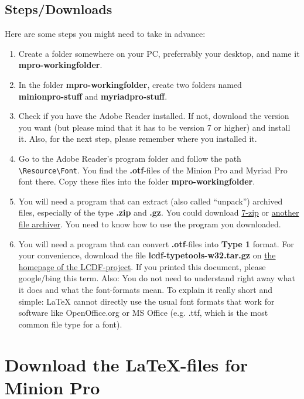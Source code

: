 \subsection{Steps/Downloads}

Here are some steps you might need to take in advance:
\begin{enumerate}\setlength{\itemsep}{-2pt}
	\item Create a folder somewhere on your PC, preferrably your desktop, and name it\\
	\textbf{mpro-workingfolder}.
	\item In the folder \textbf{mpro-workingfolder}, create two folders named\\
	\textbf{minionpro-\-stuff} and \textbf{myriadpro-\-stuff}.
	\item Check if you have the Adobe Reader installed. If not, download the version you want (but please mind that it has to be version 7 or higher) and install it. Also, for the next step, please remember where you installed it.
	\item Go to the Adobe Reader's program folder and follow the path \verb+\Resource\Font+. You find the \textbf{.otf}-files of the Minion Pro and Myriad Pro font there. Copy these files into the folder \textbf{mpro-workingfolder}.
	\item You will need a program that can extract (also called ``unpack'') archived files, especially of the type \textbf{.zip} and \textbf{.gz}. You could download \href{http://www.google.com/search?\&q=7-zip}{7-zip} or \href{http://en.wikipedia.org/wiki/Comparison_of_file_archivers}{another file archiver}. You need to know how to use the program you downloaded.
	\item You will need a program that can convert \textbf{.otf}-files into \textbf{Type 1} format. For your convenience, download the file \textbf{lcdf-typetools-w32.tar.gz} on \href{http://www.lcdf.org/type/}{the homepage of the LCDF-project}. If you printed this document, please google/bing this term. Also: You do not need to understand right away what it does and what the font-formats mean. To explain it really short and simple: \LaTeX{} cannot directly use the usual font formats that work for software like OpenOffice.org or MS Office (e.g. .ttf, which is the most common file type for a font).
\end{enumerate}

\section{Download the LaTeX-files for Minion Pro}\label{sec:download-minion}

